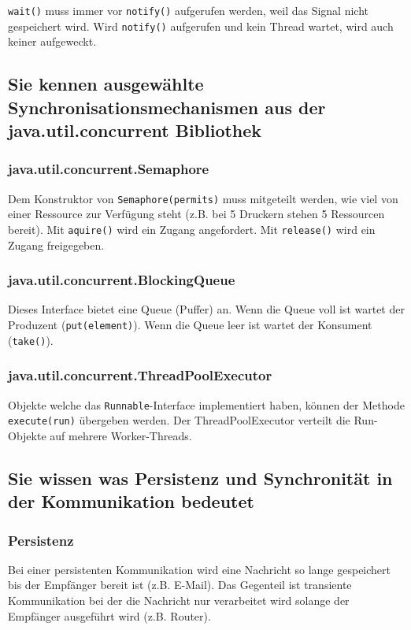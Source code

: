 \texttt{wait()} muss immer vor \texttt{notify()} aufgerufen werden, weil das Signal nicht gespeichert wird. Wird \texttt{notify()} aufgerufen und kein Thread wartet, wird auch keiner aufgeweckt.

\subsection{Sie kennen ausgewählte Synchronisationsmechanismen aus der java.util.concurrent Bibliothek}

\subsubsection{java.util.concurrent.Semaphore}

Dem Konstruktor von \texttt{Semaphore(permits)} muss mitgeteilt werden, wie viel von einer Ressource zur Verfügung steht (z.B. bei 5 Druckern stehen 5 Ressourcen bereit). Mit \texttt{aquire()} wird ein Zugang angefordert. Mit \texttt{release()} wird ein Zugang freigegeben.

\subsubsection{java.util.concurrent.BlockingQueue}

Dieses Interface bietet eine Queue (Puffer) an. Wenn die Queue voll ist wartet der Produzent (\texttt{put(element)}). Wenn die Queue leer ist wartet der Konsument (\texttt{take()}).

\subsubsection{java.util.concurrent.ThreadPoolExecutor}

Objekte welche das \texttt{Runnable}-Interface implementiert haben, können der Methode \texttt{execute(run)} übergeben werden. Der ThreadPoolExecutor verteilt die Run-Objekte auf mehrere Worker-Threads. 

\subsection{Sie wissen was Persistenz und Synchronität in der Kommunikation bedeutet}

\subsubsection{Persistenz}

Bei einer persistenten Kommunikation wird eine Nachricht so lange gespeichert bis der Empfänger bereit ist (z.B. E-Mail). Das Gegenteil ist transiente Kommunikation bei der die Nachricht nur verarbeitet wird solange der Empfänger ausgeführt wird (z.B. Router). 

